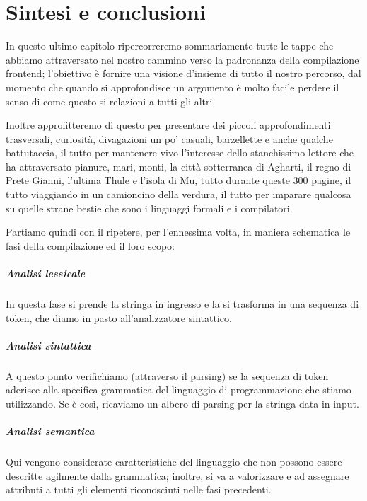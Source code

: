 \documentclass[class=book, crop=false, oneside, 12pt]{standalone}
\begin{document}
\chapter{Sintesi e conclusioni}
In questo ultimo capitolo ripercorreremo sommariamente tutte le tappe che abbiamo attraversato nel nostro cammino verso la padronanza della compilazione frontend; l'obiettivo è fornire una visione d'insieme di tutto il nostro percorso, dal momento che quando si approfondisce un argomento è molto facile perdere il senso di come questo si relazioni a tutti gli altri. 

Inoltre approfitteremo di questo per presentare dei piccoli approfondimenti trasversali, curiosità, divagazioni un po' casuali, barzellette e anche qualche battutaccia, il tutto per mantenere vivo l'interesse dello stanchissimo lettore che ha attraversato pianure, mari, monti, la città sotterranea di Agharti, il regno di Prete Gianni, l'ultima Thule e l'isola di Mu, tutto durante queste 300 pagine, il tutto viaggiando in un camioncino della verdura, il tutto per imparare qualcosa su quelle strane bestie che sono i linguaggi formali e i compilatori.


Partiamo quindi con il ripetere, per l'ennessima volta, in maniera schematica le fasi della compilazione ed il loro scopo:
\paragraph{Analisi lessicale} In questa fase si prende la stringa in ingresso e la si trasforma in una sequenza di token, che diamo in pasto all'analizzatore sintattico.

\paragraph{Analisi sintattica} A questo punto verifichiamo (attraverso il parsing) se la sequenza di token aderisce alla specifica grammatica del linguaggio di programmazione che stiamo utilizzando. Se è così, ricaviamo un albero di parsing per la stringa data in input. 

\paragraph{Analisi semantica} Qui vengono considerate caratteristiche del linguaggio che non possono essere descritte agilmente dalla grammatica; inoltre, si va a valorizzare e ad assegnare attributi a tutti gli elementi riconosciuti nelle fasi precedenti.
	
\end{document}

